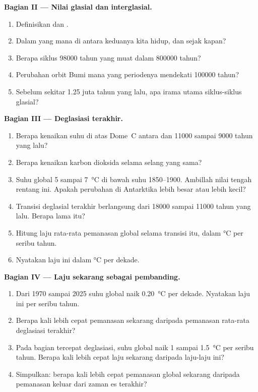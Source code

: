 \begin{problem}
\medskip
\noindent\textbf{Bagian II --- Nilai glasial dan interglasial.}
\begin{enumerate}[resume]
  \item Definisikan  dan .
  \item Dalam yang mana di antara keduanya kita hidup, dan sejak kapan?
  \item Berapa siklus \num{98000} tahun yang muat dalam \num{800000} tahun?
  \item Perubahan orbit Bumi mana yang periodenya mendekati \num{100000} tahun?
  \item Sebelum sekitar 1.25 juta tahun yang lalu, apa irama utama
        siklus-siklus glasial?
\end{enumerate}

\medskip
\noindent\textbf{Bagian III --- Deglasiasi terakhir.}
\begin{enumerate}[resume]
  \item Berapa kenaikan suhu di atas Dome~C antara 
        dan \num{11000} sampai \num{9000} tahun yang lalu?
  \item Berapa kenaikan karbon dioksida selama selang yang sama?
  \item Suhu global  5 sampai \qty{7}{\degreeCelsius}
        di bawah suhu 1850--1900. Ambillah nilai tengah rentang ini. Apakah
        perubahan di Antarktika lebih besar atau lebih kecil?
  \item Transisi deglasial terakhir berlangsung dari \num{18000} sampai
        \num{11000} tahun yang lalu. Berapa lama itu?
  \item Hitung laju rata-rata pemanasan global selama transisi itu, dalam
        \unit{\degreeCelsius} per seribu tahun.
  \item Nyatakan laju ini dalam \unit{\degreeCelsius} per dekade.
\end{enumerate}

\medskip
\noindent\textbf{Bagian IV --- Laju sekarang sebagai pembanding.}
\begin{enumerate}[resume]
  \item Dari 1970 sampai 2025 suhu global naik \qty{0.20}{\degreeCelsius} per
        dekade. Nyatakan laju ini per seribu tahun.
  \item Berapa kali lebih cepat pemanasan sekarang daripada pemanasan
        rata-rata deglasiasi terakhir?
  \item Pada bagian tercepat deglasiasi, suhu global naik 1 sampai
        \qty{1.5}{\degreeCelsius} per seribu tahun. Berapa kali lebih cepat
        laju sekarang daripada laju-laju ini?
  \item Simpulkan: berapa kali lebih cepat pemanasan global sekarang daripada
        pemanasan keluar dari zaman es terakhir?
\end{enumerate}
\end{problem}
